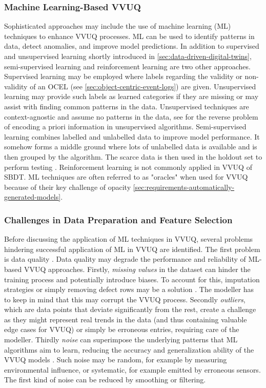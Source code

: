 \subsubsection*{Machine Learning-Based VVUQ}

Sophisticated approaches may include the use of machine learning (ML) techniques to enhance VVUQ processes. ML can be used to identify patterns in data, detect anomalies, and improve model predictions. In addition to supervised and unsupervised learning shortly introduced in \autoref{sec:data-driven-digital-twins}, semi-supervised learning and reinforcement learning are two other approaches. Supervised learning may be employed where labels regarding the validity or non-validity of an OCEL (see \autoref{sec:object-centric-event-logs}) are given. Unsupervised learning may provide such labels as learned categories if they are missing or may assist with finding common patterns in the data. Unsupervised techniques are context-agnostic and assume no patterns in the data, see \citeauthor{hastie2009unsupervised} for the reverse problem of encoding a priori information in unsupervised algorithms. Semi-supervised learning combines labelled and unlabelled data to improve model performance. It somehow forms a middle ground where lots of unlabelled data is available and is then grouped by the algorithm. The scarce data is then used in the holdout set to perform testing \autocite{learning2006semi}. Reinforcement learning is not commonly applied in VVUQ of SBDT.
ML techniques are often referred to as "oracles" when used for VVUQ because of their key challenge of opacity \autoref{sec:requirements-automatically-generated-models}.

\subsubsection*{Challenges in Data Preparation and Feature Selection}

Before discussing the application of ML techniques in VVUQ, several problems hindering successful application of ML in VVUQ are identified. The first problem is data quality \autocite{wu2025uncertainty}. Data quality may degrade the performance and reliability of ML-based VVUQ approaches. Firstly, \textit{missing values} in the dataset can hinder the training process and potentially introduce biases. To account for this, imputation strategies or simply removing defect rows may be a solution \autocite{gudivada2017data}. The modeller has to keep in mind that this may corrupt the VVUQ process. Secondly \textit{outliers}, which are data points that deviate significantly from the rest, create a challenge as they might represent real trends in the data (and thus containing valuable edge cases for VVUQ) or simply be erroneous entries, requiring care of the modeller. Thirdly \textit{noise} can superimpose the underlying patterns that ML algorithms aim to learn, reducing the accuracy and generalization ability of the VVUQ models \autocite{liu2020noise}. Such noise may be random, for example by measuring environmental influence, or systematic, for example emitted by erroneous sensors. The first kind of noise can be reduced by smoothing or filtering.

